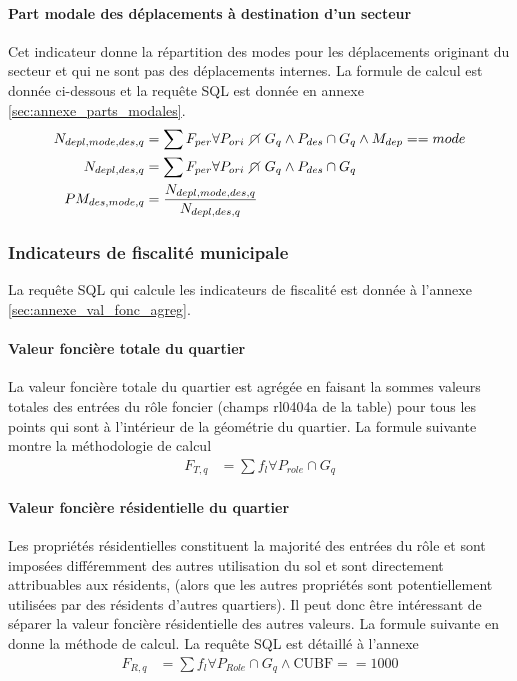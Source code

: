             \paragraph{Part modale des déplacements à destination d'un secteur}Cet indicateur donne la répartition des modes pour les déplacements originant du secteur et qui ne sont pas des déplacements internes. La formule de calcul est donnée ci-dessous et la requête SQL est donnée en annexe \ref{sec:annexe_parts_modales}.
            \begin{align}
                N_{depl,mode,des,q} &= \sum{F_{per}} \forall P_{ori}  \disjoint G_q \wedge P_{des} \cap G_q \wedge M_{dep}==mode \\
                N_{depl,des,q} &= \sum{F_{per}} \forall P_{ori} \disjoint G_q \wedge P_{des} \cap G_q \\
                PM_{des,mode,q} &= \frac{N_{depl,mode,des,q}}{N_{depl,des,q}}
            \end{align}
    
    
        \subsubsection{Indicateurs de fiscalité municipale}
        La requête SQL qui calcule les indicateurs de fiscalité est donnée à l'annexe \ref{sec:annexe_val_fonc_agreg}.
            \paragraph{Valeur foncière totale du quartier} La valeur foncière totale du quartier est agrégée en faisant la sommes valeurs totales des entrées du rôle foncier (champs rl0404a de la table) pour tous les points qui sont à l'intérieur de la géométrie du quartier. La formule suivante montre la méthodologie de calcul
            \begin{align}
                F_{T,q} &= \sum{f_{l}}\forall P_{role}\cap G_q
            \end{align}
            \paragraph{Valeur foncière résidentielle du quartier} Les propriétés résidentielles constituent la majorité des entrées du rôle et sont imposées différemment des autres utilisation du sol et sont directement attribuables aux résidents, (alors que les autres propriétés sont potentiellement utilisées par des résidents d'autres quartiers). Il peut donc être intéressant de séparer la valeur foncière résidentielle des autres valeurs. La formule suivante en donne la méthode de calcul. La requête SQL est détaillé à l'annexe 
            \begin{align}
                F_{R,q} &= \sum{f_{l}} \forall P_{Role} \cap G_q \wedge \text{CUBF} == 1000
            \end{align}
